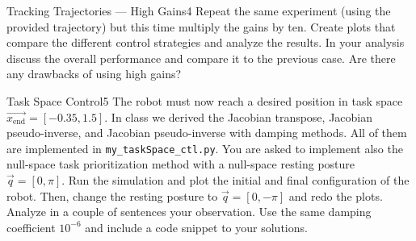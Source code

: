 \begin{questions}
	\begin{question}{Tracking Trajectories --- High Gains}{4}
		Repeat the same experiment (using the provided trajectory) but this time multiply the gains by ten. Create plots that compare the different control strategies and analyze the results. In your analysis discuss the overall performance and compare it to the previous case. Are there any drawbacks of using high gains?
		
\begin{answer}
\end{answer}
		
	\end{question}
	
	
	\begin{question}[bonus]{Task Space Control}{5}
		The robot must now reach a desired position in task space $\vec{x_\textrm{end}}={[-0.35,1.5]}$. In class we derived the Jacobian transpose, Jacobian pseudo-inverse, and Jacobian pseudo-inverse with damping methods. All of them are implemented in \texttt{my\_taskSpace\_ctl.py}. You are asked to implement also the null-space task prioritization method with a null-space resting posture $\vec q=[0,\pi]$. Run the simulation and plot the initial and final configuration of the robot. Then, change the resting posture to $\vec q=[0,-\pi]$ and redo the plots. Analyze in a couple of sentences your observation. Use the same damping coefficient $10^{-6}$ and include a code snippet to your solutions.
		
\begin{answer}
\end{answer}
		
	\end{question}
	
\end{questions}

